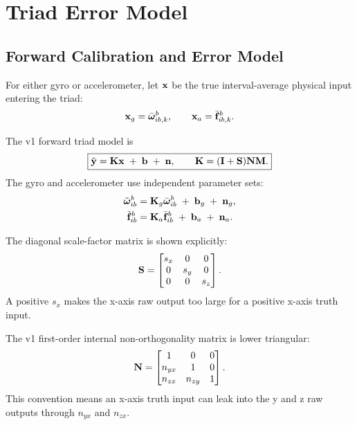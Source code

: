 \chapter{Triad Error Model}

\section{Forward Calibration and Error Model}

For either gyro or accelerometer, let $\mathbf{x}$ be the true interval-average
physical input entering the triad:
\begin{equation}
\mathbf{x}_g=\bar{\boldsymbol{\omega}}_{ib,k}^{b},
\qquad
\mathbf{x}_a=\bar{\mathbf{f}}_{ib,k}^{b}.
\end{equation}

The v1 forward triad model is
\begin{equation}
\boxed{
\tilde{\mathbf{y}}
=
\mathbf{K}\mathbf{x}
\;+\;
\mathbf{b}
\;+\;
\mathbf{n},
\qquad
\mathbf{K}
=
(\mathbf{I}+\mathbf{S})\mathbf{N}\mathbf{M}.
}
\label{eq:imu_forward_triad_model}
\end{equation}
The gyro and accelerometer use independent parameter sets:
\begin{align}
\tilde{\boldsymbol{\omega}}_{ib}^{b}
&=
\mathbf{K}_g\bar{\boldsymbol{\omega}}_{ib}^{b}
\;+\;
\mathbf{b}_g
\;+\;
\mathbf{n}_g,\\
\tilde{\mathbf{f}}_{ib}^{b}
&=
\mathbf{K}_a\bar{\mathbf{f}}_{ib}^{b}
\;+\;
\mathbf{b}_a
\;+\;
\mathbf{n}_a.
\end{align}

The diagonal scale-factor matrix is shown explicitly:
\begin{equation}
\mathbf{S}
=
\begin{bmatrix}
s_x & 0 & 0\\
0 & s_y & 0\\
0 & 0 & s_z
\end{bmatrix}.
\label{eq:imu_scale_factor_matrix}
\end{equation}
A positive $s_x$ makes the x-axis raw output too large for a positive x-axis
truth input.

The v1 first-order internal non-orthogonality matrix is lower triangular:
\begin{equation}
\mathbf{N}
=
\begin{bmatrix}
1 & 0 & 0\\
n_{yx} & 1 & 0\\
n_{zx} & n_{zy} & 1
\end{bmatrix}.
\label{eq:imu_nonorthogonality_matrix}
\end{equation}
This convention means an x-axis truth input can leak into the y and z raw
outputs through $n_{yx}$ and $n_{zx}$.


